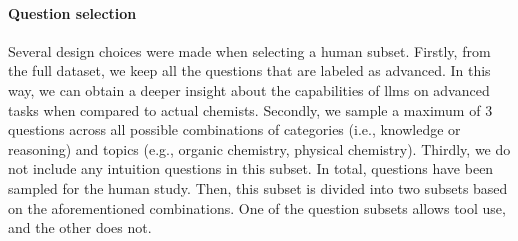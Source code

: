 \paragraph{Question selection}

Several design choices were made when selecting a human subset. Firstly, from the full dataset, we keep all the questions that are labeled as advanced. In this way, we can obtain a deeper insight about the capabilities of \glspl{llm} on advanced tasks
when compared to actual chemists. Secondly, we sample a maximum of 3 questions across all possible combinations of categories (i.e., knowledge or reasoning) and topics (e.g., organic chemistry, physical chemistry). Thirdly, we do not include any intuition questions
in this subset. In total,  questions have been sampled for the human study. Then, this subset is divided into two subsets based on the aforementioned combinations. One of the question subsets allows tool use, and the other does not.
